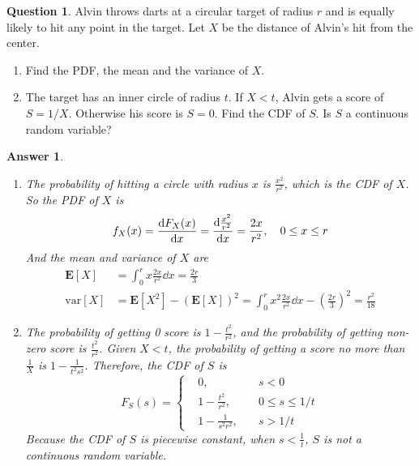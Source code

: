 \documentclass[utf8]{article}
\theoremstyle{definition}%
\newtheorem{question}{Question} %
\theoremstyle{plain}%
\newtheorem{answer}{Answer} %
\begin{document}
\begin{question}
    Alvin throws darts at a circular target of radius $r$ and is equally likely to hit any point in the target. Let $X$ be the distance of Alvin's hit from the center.
    \begin{enumerate}[label=(\alph*)]
        \item Find the PDF, the mean and the variance of $X$.
        \item The target has an inner circle of radius $t$. If $X < t$, Alvin gets a score of $S = 1/X$. Otherwise his score is $S = 0$. Find the CDF of $S$. Is $S$ a continuous random variable?
    \end{enumerate}
\end{question}
\begin{answer} ~
    \begin{enumerate}[label=(\alph*)]
        \item The probability of hitting a circle with radius $x$ is $\frac{x^2}{r^2}$, which is the CDF of $X$. So the PDF of $X$ is
        \begin{equation}
            f_{X}(x) = \dv{F_{X}(x)}{x} = \dv{\frac{x^2}{r^2}}{x} = \frac{2x}{r^2}, \quad 0 \leq x \leq r
        \end{equation}
        And the mean and variance of $X$ are
        \begin{align}
            \mathbf{E}[X] &= \int_{0}^{r} x\frac{2x}{r^2} \dd{x} = \frac{2r}{3} \\ 
            \text{var}[X] &= \mathbf{E}[X^2] - (\mathbf{E}[X])^2 = \int_{0}^{r} x^2\frac{2x}{r^2} \dd{x} - \left(\frac{2r}{3}\right)^2 = \frac{r^2}{18}
        \end{align}
        \item The probability of getting 0 score is $1 - \frac{t^2}{r^2}$, and the probability of getting non-zero score is $\frac{t^2}{r^2}$. Given $X < t$, the probability of getting a score no more than $\frac{1}{X}$ is $1 - \frac{1}{t^2s^2}$. Therefore, the CDF of $S$ is
        \begin{equation}
            F_{S}(s) = \left\{\begin{aligned}
                &0, \quad &s < 0 \\
                &1 - \frac{t^2}{r^2}, \quad &0 \leq s \leq 1/t \\ 
                &1 - \frac{1}{s^2r^2}, \quad &s > 1/t
            \end{aligned}\right.
        \end{equation}
        Because the CDF of $S$ is piecewise constant, when $s < \frac{1}{t}$, $S$ is not a continuous random variable.
    \end{enumerate}
\end{answer}
\end{document}
